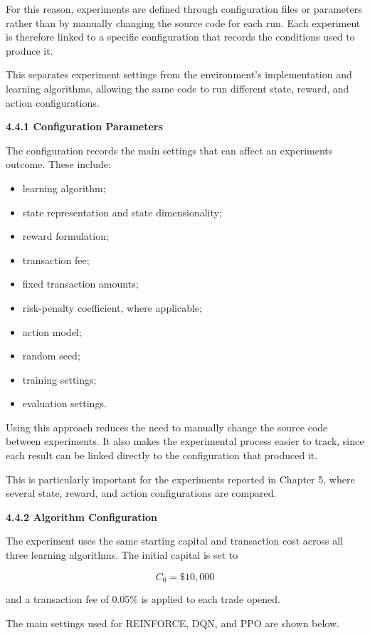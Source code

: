 For this reason, experiments are defined through configuration files or
parameters rather than by manually changing the source code for each
run. Each experiment is therefore linked to a specific configuration
that records the conditions used to produce it.

This separates experiment settings from the environment's implementation
and learning algorithms, allowing the same code to run different state,
reward, and action configurations.

\textbf{4.4.1 Configuration Parameters}

The configuration records the main settings that can affect an
experiment\textquotesingle s outcome. These include:

\begin{itemize}
\item
  learning algorithm;
\item
  state representation and state dimensionality;
\item
  reward formulation;
\item
  transaction fee;
\item
  fixed transaction amounts;
\item
  risk-penalty coefficient, where applicable;
\item
  action model;
\item
  random seed;
\item
  training settings;
\item
  evaluation settings.
\end{itemize}

Using this approach reduces the need to manually change the source code
between experiments. It also makes the experimental process easier to
track, since each result can be linked directly to the configuration
that produced it.

This is particularly important for the experiments reported in Chapter
5, where several state, reward, and action configurations are compared.

\textbf{4.4.2 Algorithm Configuration}

The experiment uses the same starting capital and transaction cost
across all three learning algorithms. The initial capital is set to

\[C_{0} = \$ 10,000\]

and a transaction fee of 0.05\% is applied to each trade opened.

The main settings used for REINFORCE, DQN, and PPO are shown below.

